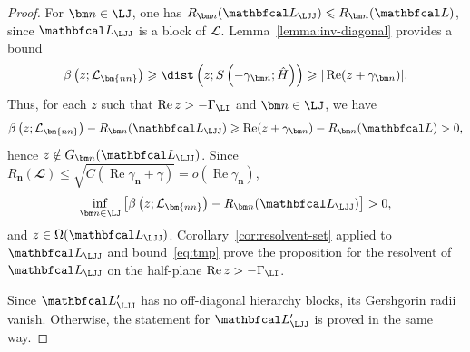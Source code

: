 \documentclass{SciPost}
\renewcommand{\Re}{\operatorname{Re}}
\begin{document}
\begin{proof}
    For \(\bm n \in \LJ\), one has
    $
        R_{\bm n}(\mathbfcal L_\LJJ)
        \leqslant
        R_{\bm n}(\mathbfcal L)
    $,
    since \(\mathbfcal L_\LJJ\) is a block of \(\mathbfcal L\). Lemma~\ref{lemma:inv-diagonal} provides a bound
    \begin{equation}
        \beta\left(z; \mathcal L_{\bm{nn}}\right) \geqslant 
        \dist\left(z; S\left(-\gamma_{\bm n}; \hat H\right)\right) \geqslant
        |\Re(z + \gamma_{\bm n})|.
        \label{eq:tmp}
    \end{equation}
    Thus, for each $z$ such that $\Re z > -\Gamma_\LI$ and $\bm n \in \LJ$, we have
    \begin{equation}
        \beta\left(z; \mathcal L_{\bm{nn}}\right) - R_{\bm n}(\mathbfcal L_\LJJ) \geqslant 
        \Re(z + \gamma_{\bm n}) - R_{\bm n}(\mathbfcal L) > 0,
    \end{equation}
    hence $z \notin G_{\bm n}(\mathbfcal L_\LJJ)$. Since $R_{\bm n}(\mathbfcal L) \leqslant \sqrt{C(\Re \gamma_{\bm n} + \gamma)} = o(\Re \gamma_{\bm n})$,
    \begin{equation}
        \inf_{\bm n \in \LJ} \left [ \beta\left(z; \mathcal L_{\bm{nn}}\right) - R_{\bm n}(\mathbfcal L_\LJJ) \right ] > 0,
    \end{equation}
    and $z \in \Omega(\mathbfcal L_\LJJ)$. Corollary~\ref{cor:resolvent-set} applied to $\mathbfcal L_\LJJ$ and bound~\eqref{eq:tmp} prove the proposition for the resolvent of $\mathbfcal L_\LJJ$ on the half-plane $\Re z > -\Gamma_\LI$.

    Since \(\mathbfcal L_\LJJ'\) has no off-diagonal hierarchy blocks, its Gershgorin radii vanish. Otherwise,
    the statement for \(\mathbfcal L_\LJJ'\) is proved in the same way.
\end{proof}
\end{document}
